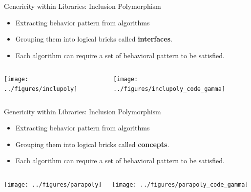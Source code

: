 \documentclass[12pt,aspectratio=169]{beamer}
\begin{document}
\begin{frame}[fragile]{Genericity within Libraries: Inclusion Polymorphism}
  \begin{itemize}
    \item Extracting behavior pattern from algorithms
    \item Grouping them into logical bricks called \textbf{interfaces}.
    \item Each algorithm can require a set of behavioral pattern to be satisfied.
  \end{itemize}

  \begin{columns}[T,onlytextwidth]
    \centering
    \texttt{[image: ../figures/inclupoly]}

    \centering
    \texttt{[image: ../figures/inclupoly\_code\_gamma]}
  \end{columns}
\end{frame}

\begin{frame}[fragile]{Genericity within Libraries: Inclusion Polymorphism}
  \begin{itemize}
    \item Extracting behavior pattern from algorithms
    \item Grouping them into logical bricks called \textbf{concepts}.
    \item Each algorithm can require a set of behavioral pattern to be satisfied.
  \end{itemize}

  \begin{columns}[T,onlytextwidth]
    \centering
    \texttt{[image: ../figures/parapoly]}

    \centering
    \texttt{[image: ../figures/parapoly\_code\_gamma]}
  \end{columns}
\end{frame}
\end{document}
